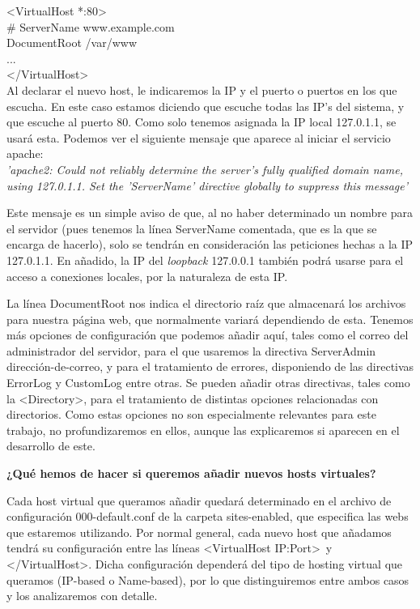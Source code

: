 \documentclass[a4paper, 10pt]{article} %
\begin{document}
<VirtualHost *:80> \\
	\# ServerName www.example.com\\
	DocumentRoot /var/www \\
	...\\
</VirtualHost>\\

Al declarar el nuevo host, le indicaremos la IP y el puerto o puertos en los que escucha. En este caso estamos diciendo que escuche todas las IP's del sistema, y que escuche al puerto 80. Como solo tenemos asignada la IP local 127.0.1.1, se usará esta. Podemos ver el siguiente mensaje que aparece al iniciar el servicio apache: \\
\textit{'apache2: Could not reliably determine the server's fully qualified domain name, using 127.0.1.1. Set the 'ServerName' directive globally to suppress this message'}

Este mensaje es un simple aviso de que, al no haber determinado un nombre para el servidor (pues tenemos la línea ServerName comentada, que es la que se encarga de hacerlo), solo se tendrán en consideración las peticiones hechas a la IP 127.0.1.1. En añadido, la IP del \textit{loopback} 127.0.0.1 también podrá usarse para el acceso a conexiones locales, por la naturaleza de esta IP. 

La línea DocumentRoot nos indica el directorio raíz que almacenará los archivos para nuestra página web, que normalmente variará dependiendo de esta. Tenemos más opciones de configuración que podemos añadir aquí, tales como el correo del administrador del servidor, para el que usaremos la directiva ServerAdmin dirección-de-correo, y para el tratamiento de errores, disponiendo de las directivas ErrorLog y CustomLog entre otras. Se pueden añadir otras directivas, tales como la <Directory>, para el tratamiento de distintas opciones relacionadas con directorios. Como estas opciones no son especialmente relevantes para este trabajo, no profundizaremos en ellos, aunque las explicaremos si aparecen en el desarrollo de este. 

\textbf{¿Qué hemos de hacer si queremos añadir nuevos hosts virtuales?}

Cada host virtual que queramos añadir quedará determinado en el archivo de configuración 000-default.conf de la carpeta sites-enabled, que especifica las webs que estaremos utilizando. Por normal general, cada nuevo host que añadamos tendrá su configuración entre las líneas <VirtualHost IP:Port>\ y </VirtualHost>. Dicha configuración dependerá del tipo de hosting virtual que queramos (IP-based o Name-based), por lo que distinguiremos entre ambos casos y los analizaremos con detalle. 
\end{document}
